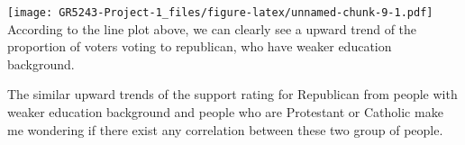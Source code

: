 \documentclass[
]{article}
\newenvironment{Shaded}{\begin{snugshade}}{\end{snugshade}}
\newcommand{\DataTypeTok}[1]{\textcolor[rgb]{0.13,0.29,0.53}{#1}}
\newcommand{\DecValTok}[1]{\textcolor[rgb]{0.00,0.00,0.81}{#1}}
\newcommand{\KeywordTok}[1]{\textcolor[rgb]{0.13,0.29,0.53}{\textbf{#1}}}
\newcommand{\NormalTok}[1]{#1}
\newcommand{\OperatorTok}[1]{\textcolor[rgb]{0.81,0.36,0.00}{\textbf{#1}}}
\newcommand{\StringTok}[1]{\textcolor[rgb]{0.31,0.60,0.02}{#1}}
\begin{document}
\begin{Shaded}
\end{Shaded}

\texttt{[image: GR5243-Project-1\_files/figure-latex/unnamed-chunk-9-1.pdf]}
According to the line plot above, we can clearly see a upward trend of
the proportion of voters voting to republican, who have weaker education
background.

The similar upward trends of the support rating for Republican from
people with weaker education background and people who are Protestant or
Catholic make me wondering if there exist any correlation between these
two group of people.
\end{document}
